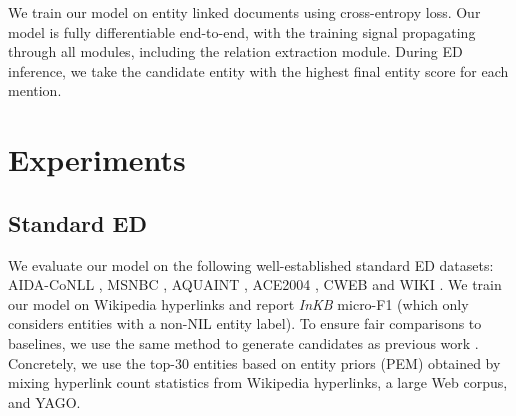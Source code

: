 \documentclass[11pt]{article}
\begin{document}
We train our model on entity linked documents using cross-entropy loss. Our model is fully differentiable end-to-end, with the training signal propagating through all modules, including the relation extraction module. During ED inference, we take the candidate entity with the highest final entity score for each mention.


\section{Experiments}









\subsection{Standard ED}
We evaluate our model on the following well-established standard ED datasets: AIDA-CoNLL \citep{hoffart-etal-2011-robust}, MSNBC \citep{msnbc}, AQUAINT \citep{aquaint}, ACE2004 \citep{ace2004}, CWEB \citep{cweb} and WIKI \citep{wiki}. We train our model on Wikipedia hyperlinks and report \emph{InKB} micro-F1 (which only considers entities with a non-NIL entity label). To ensure fair comparisons to baselines, we use the same method to generate candidates as previous work \citep{decao2020autoregressive, le-titov-2018-improving}. Concretely, we use the top-30 entities based on entity priors (PEM) obtained by mixing hyperlink count statistics from Wikipedia hyperlinks, a large Web corpus, and YAGO.
\end{document}
